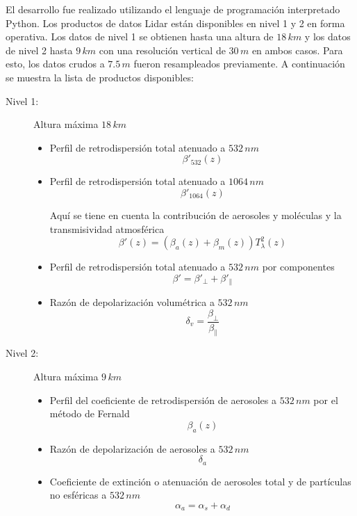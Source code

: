\documentclass[12pt,a4paper,final]{report}
\begin{document}
	El desarrollo fue realizado utilizando el lenguaje de programación interpretado Python. Los productos de datos Lidar están disponibles en nivel 1 y 2 en forma operativa. Los datos de nivel 1 se obtienen hasta una altura de $18 \, km$ y los datos de nivel 2 hasta $9 \, km$ con una resolución vertical de $30 \, m$ en ambos casos. Para esto, los datos crudos a $7.5 \, m$ fueron resampleados previamente. A continuación se muestra la lista de productos disponibles:
	\begin{description}
		\item[Nivel 1:] Altura máxima $18 \, km$		
	\begin{itemize}
		\item Perfil de retrodispersión total atenuado a $532 \, nm$
		\begin{equation*}
		\beta'_{532}(z)
		\end{equation*}
		\item Perfil de retrodispersión total atenuado a $1064 \, nm$
		\begin{equation*}
		\beta'_{1064}(z)
		\end{equation*}
		
		Aquí se tiene en cuenta la contribución de aerosoles y moléculas y la transmisividad atmosférica
		\begin{equation*}
		\beta'(z)=(\beta_a(z) + \beta_m(z)) T_{\lambda}^2(z)
		\end{equation*}
		\item Perfil de retrodispersión total atenuado a $532 \, nm$ por componentes
		\begin{equation*}
		\beta'=\beta'_{\perp}+\beta'_{\parallel}
		\end{equation*}
		\item Razón de depolarización volumétrica a $532 \, nm$
		\begin{equation*}
		\delta_v = \dfrac{\beta_{\perp}}{\beta_{\parallel}}
		\end{equation*}
	\end{itemize}
	\item[Nivel 2:] Altura máxima $9 \, km$	
	
	\begin{itemize}
		\item Perfil del coeficiente de retrodispersión de aerosoles a $532 \, nm$ por el método de Fernald
		\begin{equation*}
		\beta_a(z)
		\end{equation*}
		\item Razón de depolarización de aerosoles a $532 \, nm$
		\begin{equation*}
		\delta_a
		\end{equation*}
		\item Coeficiente de extinción o atenuación de aerosoles total y de partículas no esféricas a $532 \, nm$ 
		\begin{equation*}
		\alpha_a = \alpha_s + \alpha_d
		\end{equation*}
	\end{itemize}
	\end{description}
	
\end{document}
